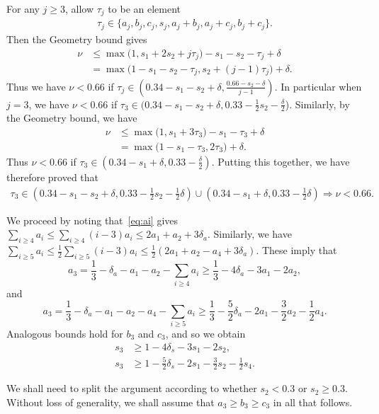 For any $j\ge3$, allow  $\tau_j$ to be an element
\begin{align}\label{eq:taujdef}
\tau_j\in\{a_j,b_j,c_j, s_j, a_j+b_j,a_j+c_j,b_j+c_j\}.
\end{align}
Then the Geometry bound gives
\begin{align*}
\nu & \le \max\big(1, s_1+2s_2+j\tau_j\big)-s_1-s_2-\tau_j +\delta\\
& = \max\big(1-s_1-s_2-\tau_j, s_2+(j-1)\tau_j \big)+\delta.
\end{align*}
Thus we have  $\nu< 0.66$ if
$\tau_j\in (0.34-s_1-s_2+\delta, \frac{0.66-s_2-\delta}{j-1})$.
In particular when $j=3$, we have $\nu< 0.66$ if
$\tau_3\in (0.34-s_1-s_2+\delta, 0.33-\frac{1}{2}s_2-\frac{\delta}{2}$).
Similarly, by the Geometry bound, we have
\begin{align*}
\nu & \le \max\big(1, s_1+3\tau_3\big)-s_1-\tau_3+\delta\\
&= \max\big(1-s_1-\tau_3, 2\tau_3\big)+\delta.
\end{align*}
Thus $\nu< 0.66$ if $\tau_3\in (0.34-s_1+\delta, 0.33-\frac{\delta}{2})$.
Putting this together, we have therefore proved that
\begin{align}\label{eq:Geotau3}
\tau_3\in
 \left(0.34-s_1-s_2+\delta,
0.33 -\frac{1}{2}s_2-\frac{1}{2}\delta\right)
\cup
\left(0.34-s_1+\delta, 0.33-\frac{1}{2}\delta\right)
 \Longrightarrow
\nu < 0.66.
\end{align}

We proceed by noting that~\eqref{eq:ai} gives $\sum_{i\ge4}a_i \le \sum_{i\ge4}(i-3)a_i \le 2a_1+a_2+3\delta_a$. Similarly, we have  $\sum_{i\ge5}a_i \le \frac{1}{2}\sum_{i\ge5}(i-3)a_i\le\frac{1}{2}(2a_1+a_2-a_4+3\delta_a)$. These imply that
\begin{equation}
a_3 = \frac{1}{3}-\delta_a - a_1-a_2 - \sum_{i\ge4}a_i \ge \frac{1}{3}-4\delta_a - 3a_1 - 2a_2,
\label{eq:black1}
\end{equation}
and
$$
a_3 = \frac{1}{3}-\delta_a - a_1-a_2 - a_4 - \sum_{i\ge5}a_i \ge \frac{1}{3}-\frac{5}{2}\delta_a - 2a_1 - \frac{3}{2}a_2 - \frac{1}{2}a_4.
$$
Analogous bounds hold for $b_3$ and $c_3$, and so we obtain
\begin{align}
s_3 &\ge 1-4\delta_s - 3s_1 - 2s_2, \label{eq:s3>s12}\\
s_3 & \ge 1-\frac{5}{2}\delta_s - 2s_1 - \frac{3}{2}s_2 - \frac{1}{2}s_4.\label{eq:s3>s124}
\end{align}


We shall need to split the argument according to whether $s_2<0.3$ or
$s_2\geq 0.3$.
Without loss of generality,  we shall assume that  $a_3\ge b_3\ge c_3$ in all that follows.


